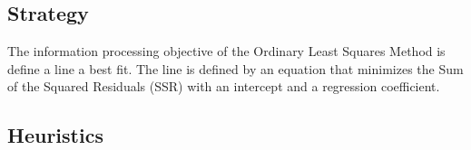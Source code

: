 \subsection{Strategy}
The information processing objective of the Ordinary Least Squares Method is define a line a best fit.
The line is defined by an equation that minimizes the Sum of the Squared Residuals (SSR) with an intercept and a regression coefficient.

\subsection{Heuristics}

